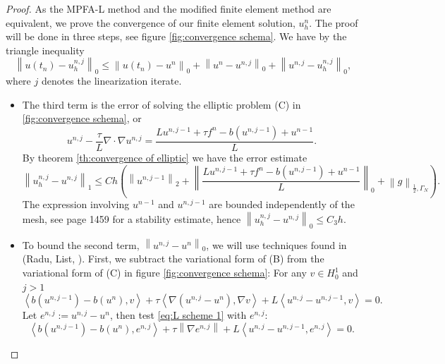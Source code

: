 \documentclass[../Main/main.tex]{subfiles}
\begin{document}
	\begin{proof}
		As the MPFA-L method and the modified finite element method are equivalent, we prove the convergence of our finite element solution, $u^{n}_h$.
		The proof will be done in three steps, see figure \ref{fig:convergence schema}.
		We have by the triangle inequality
		\begin{equation}
			\left \|u(t_n)-u_h^{n,j}\right \|_0 \leq\left \|u(t_n) -u^n  \right \|_0 + \left \|u^{n}-u^{n,j}\right \|_0 + \left \|u^{n,j}-u_h^{n,j}\right \|_0,
		\end{equation}
		where $j$ denotes the linearization iterate.
		\begin{itemize}
			\item The third term is the error of solving the elliptic problem (C) in \ref{fig:convergence schema}, or 
			\begin{equation}\label{eq:first ineq}
				u^{n,j}-\frac{\tau}{L} \nabla \cdot \nabla u^{n,j} = \frac{L u^{n,j-1} + \tau f^n - b(u^{n,j-1}) + u^{n-1}}{L}.
			\end{equation}
			By theorem \ref{th:convergence of elliptic} we have the error estimate
			\begin{equation}
				\left \|u_h^{n,j}-u^{n,j}\right \|_1  \leq C h (\left \| u^{n,j-1} \right \|_2 + \left \| \frac{L u^{n,j-1} + \tau f^n - b(u^{n,j-1}) + u^{n-1}}{L} \right \|_0 + \left \| g \right \|_{\frac{1}{2},\Gamma_N}).
			\end{equation}
			The expression involving $u^{n-1}$ and $u^{n,j-1}$ are bounded independently of the mesh, see \cite{FlorinTimeConvergence} page 1459 for a stability estimate, hence $\left \|u_h^{n,j}-u^{n,j}\right \|_0 \leq C_3h$.
		\item To bound the second term, $\left \|u^{n,j}-u^n\right \|_0$, we will use techniques found in (Radu, List, \cite{list2016study}). First, we subtract the variational form of (B) from the variational form of (C) in figure \ref{fig:convergence schema}:
		For any $v\in H_0^1$ and $j>1$
		\begin{equation}\label{eq:L scheme 1}
			\left\langle b(u^{n,j-1})-b(u^n),v\right \rangle + \tau \left \langle \nabla (u^{n,j}-u^n), \nabla v\right \rangle +L\left \langle u^{n,j}-u^{n,j-1} ,v\right \rangle=0.
		\end{equation}
		Let $e^{n,j}:=u^{n,j}-u^n$, then test \eqref{eq:L scheme 1} with $e^{n,j}$:
		\begin{equation}
\left\langle b(u^{n,j-1})-b(u^n),e^{n,j}\right \rangle + \tau \left \| \nabla e^{n,j}\right \| +L\left \langle u^{n,j}-u^{n,j-1} ,e^{n,j}\right \rangle=0.

\end{equation}
\end{itemize}
\end{proof}
\end{document}
